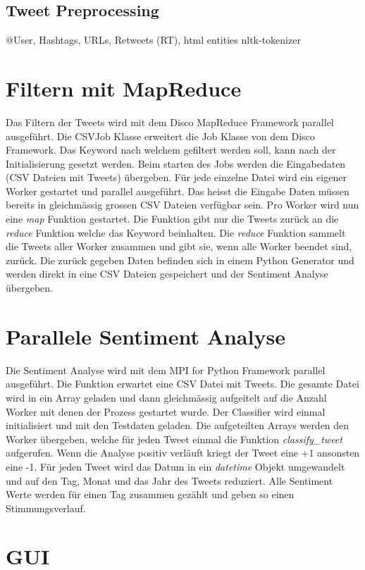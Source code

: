 \documentclass[12pt, oneside]{report}   	%
\begin{document}
\subsection{Tweet Preprocessing}
@User, Hashtags, URLs, Retweets (RT), html entities
nltk-tokenizer

\section{Filtern mit MapReduce}
Das Filtern der Tweets wird mit dem Disco MapReduce Framework parallel ausgeführt. Die CSVJob Klasse erweitert die Job Klasse von dem Disco Framework. Das Keyword nach welchem gefiltert werden soll, kann nach der Initialisierung gesetzt werden. Beim starten des Jobs werden die Eingabedaten (CSV Dateien mit Tweets) übergeben. Für jede einzelne Datei wird ein eigener Worker gestartet und parallel ausgeführt. Das heisst die Eingabe Daten müssen bereits in gleichmässig grossen CSV Dateien verfügbar sein. Pro Worker wird nun eine \emph{map} Funktion gestartet. Die Funktion gibt nur die Tweets zurück an die \emph{reduce} Funktion welche das Keyword beinhalten. Die \emph{reduce} Funktion sammelt die Tweets aller Worker zusammen und gibt sie, wenn alle Worker beendet sind, zurück. Die zurück gegeben Daten befinden sich in einem Python Generator und werden direkt in eine CSV Dateien gespeichert und der Sentiment Analyse übergeben.

\section{Parallele Sentiment Analyse}
Die Sentiment Analyse wird mit dem MPI for Python Framework parallel ausgeführt. Die Funktion erwartet eine CSV Datei mit Tweets. Die gesamte Datei wird in ein Array geladen und dann gleichmässig aufgeitelt auf die Anzahl Worker mit denen der Prozess gestartet wurde. Der Classifier wird einmal initialisiert und mit den Testdaten geladen. Die aufgeteilten Arrays werden den Worker übergeben, welche für jeden Tweet einmal die Funktion \emph{classify\_tweet} aufgerufen. Wenn die Analyse positiv verläuft kriegt der Tweet eine +1 ansonsten eine -1. \newline{} 
%
Für jeden Tweet wird das Datum in ein \emph{datetime} Objekt umgewandelt und auf den Tag, Monat und das Jahr des Tweets reduziert. Alle Sentiment Werte werden für einen Tag zusammen gezählt und geben so einen Stimmungsverlauf.

\section{GUI}
\end{document}
